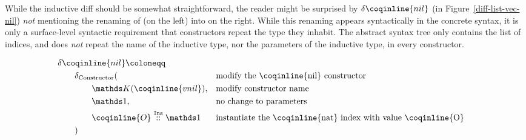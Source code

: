 While the inductive diff should be somewhat straightforward, the reader might be
surprised by $\delta\coqinline{nil}$ (in Figure~\ref{diff-list-vec-nil})
\emph{not} mentioning the renaming of  (on the left) into
 on the right.  While this renaming appears syntactically in the
concrete syntax, it is only a surface-level syntactic requirement that
constructors repeat the type they inhabit.  The abstract syntax tree only
contains the list of indices, and does \emph{not} repeat the name of the inductive
type, nor the parameters of the inductive type, in every constructor.

\begin{figure*}[!htp]

  \noindent%
\cprotect{}%
\cprotect{}

  \vspace{2em}%

  \begin{align*}
& \delta\coqinline{nil} \coloneqq & && \\
& \qquad \deltaConstructor{} ( && \text{modify the \coqinline{nil} constructor} \\
& \qquad \qquad \MathReplace{\coqinline{vnil}}, && \text{modify constructor name} \\
& \qquad \qquad \MathSame{},                    && \text{no change to parameters} \\
& \qquad \qquad \MathIns{\coqinline{O}}{\MathSame{}}
  && \text{instantiate the \coqinline{nat} index with value \coqinline{O}} \\
& \qquad ) && \\
  \end{align*}

  \caption{Diff for our running example ( constructor only)}
  \label{diff-list-vec-nil}

\end{figure*}

